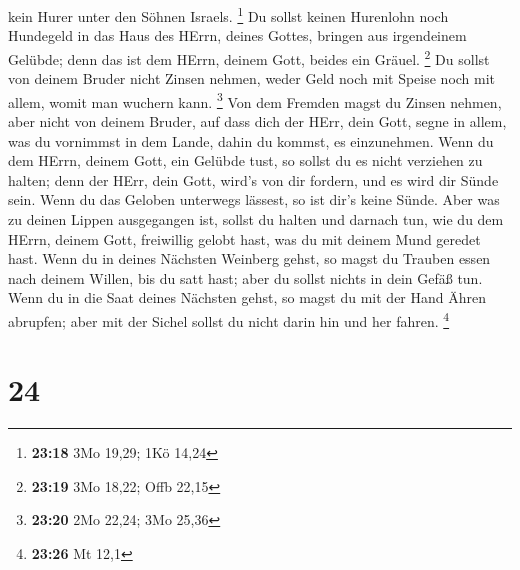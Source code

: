 kein Hurer unter den Söhnen Israels. \footnote{\textbf{23:18} 3Mo 19,29;
  1Kö 14,24}  Du sollst keinen Hurenlohn noch Hundegeld
in das Haus des HErrn, deines Gottes, bringen aus irgendeinem Gelübde;
denn das ist dem HErrn, deinem Gott, beides ein Gräuel. \footnote{\textbf{23:19}
  3Mo 18,22; Offb 22,15}  Du sollst von deinem Bruder
nicht Zinsen nehmen, weder Geld noch mit Speise noch mit allem, womit
man wuchern kann. \footnote{\textbf{23:20} 2Mo 22,24; 3Mo 25,36}
 Von dem Fremden magst du Zinsen nehmen, aber nicht von
deinem Bruder, auf dass dich der HErr, dein Gott, segne in allem, was du
vornimmst in dem Lande, dahin du kommst, es einzunehmen. 
Wenn du dem HErrn, deinem Gott, ein Gelübde tust, so sollst du es nicht
verziehen zu halten; denn der HErr, dein Gott, wird's von dir fordern,
und es wird dir Sünde sein.  Wenn du das Geloben
unterwegs lässest, so ist dir's keine Sünde.  Aber was zu
deinen Lippen ausgegangen ist, sollst du halten und darnach tun, wie du
dem HErrn, deinem Gott, freiwillig gelobt hast, was du mit deinem Mund
geredet hast.  Wenn du in deines Nächsten Weinberg gehst,
so magst du Trauben essen nach deinem Willen, bis du satt hast; aber du
sollst nichts in dein Gefäß tun.  Wenn du in die Saat
deines Nächsten gehst, so magst du mit der Hand Ähren abrupfen; aber mit
der Sichel sollst du nicht darin hin und her fahren. \footnote{\textbf{23:26}
  Mt 12,1}

\hypertarget{section-23}{%
\section{24}\label{section-23}}

